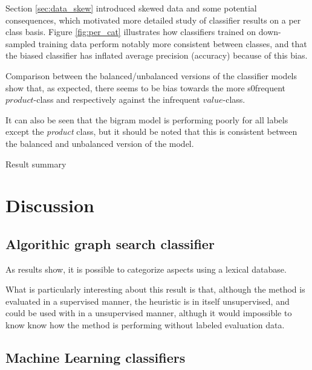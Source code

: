 \documentclass[a4paper,11pt]{kth-mag}
\begin{document}
Section \ref{sec:data_skew} introduced skewed data and some potential consequences, which motivated more detailed study of classifier results on a per class basis. Figure \ref{fig:per_cat} illustrates how classifiers trained on
down-sampled training data perform notably more consistent between classes, and that the biased classifier has inflated average precision (accuracy) because of this bias.

Comparison between the balanced/unbalanced versions of the classifier models show that, as expected, there seems to be bias towards the more s0frequent $product$-class and respectively against the infrequent $value$-class.

It can also be seen that the bigram model is performing poorly for all labels except the \emph{product} class, but it should be noted that this is consistent between the balanced and unbalanced version of the model.


\begin{table}[h]
  \centering

  \vspace{0.4cm}\caption{Result summary}
  \label{general_asp}
\end{table}

\section{Discussion}
\subsection{Algorithic graph search classifier}
As results show, it is possible to categorize aspects using a lexical database.

What is particularly interesting about this result is that, although the method is evaluated in a supervised
manner, the heuristic is in itself unsupervised, and could be used with in a unsupervised manner, althugh it would impossible to know know how the method is performing without labeled evaluation data.

\subsection{Machine Learning classifiers}
\end{document}
